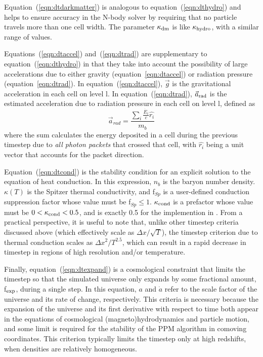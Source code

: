 Equation~(\ref{eqn:dtdarkmatter}) is analogous to
equation~(\ref{eqn:dthydro}) and helps to ensure accuracy in the N-body solver
by requiring that no particle travels more than one cell
width.  The parameter $\kappa_{\rm dm}$ is like $\kappa_{\rm
hydro}$, with a similar range of values.

Equations~(\ref{eqn:dtaccel}) and~(\ref{eqn:dtrad}) are supplementary to equation~(\ref{eqn:dthydro}) in that they
take into account the possibility of large accelerations due to either
gravity (equation~\ref{eqn:dtaccel}) or radiation pressure
(equation~\ref{eqn:dtrad}).  In equation~(\ref{eqn:dtaccel}), $\vec{g}$ is the
gravitational acceleration in each cell on level l.  In
equation~(\ref{eqn:dtrad}), $\vec{a}_{\rm rad}$ is the estimated
acceleration due to radiation pressure in each cell on level l,
defined as
\begin{equation}
\vec{a}_{rad} = \frac{ \sum_i \frac{\dot{E_i}}{c} \hat{r_i} }{m_b} 
\end{equation}
where the sum calculates the energy deposited in a cell during the
previous timestep due to \textit{all photon packets} that crossed that
cell, with $\hat{r_i}$ being a unit vector that accounts for the
packet direction.

Equation~(\ref{eqn:dtcond}) is the stability condition for an explicit
solution to the equation of heat conduction.  In this expression,
$n_b$ is the baryon number density. 
$\kappa(T)$ is the Spitzer thermal conductivity, and f$_{Sp}$ is a user-defined
conduction suppression factor whose value must be f$_{Sp} \leq 1$.  
$\kappa_{\rm cond}$ is a prefactor whose
value must be $0 < \kappa_{\rm cond}  < 0.5$, and is exactly 0.5 for the
implemention in \enzo.
From a practical
perspective, it is useful to note that, unlike other timestep criteria
discussed above (which effectively scale as $\Delta x / \sqrt{T}$),
the timestep criterion due to thermal conduction scales as $\Delta x^2
/ T^{2.5}$, which can result in a rapid decrease in timestep in
regions of high resolution and/or temperature.

Finally, equation~(\ref{eqn:dtexpand}) is a cosmological constraint that
limits the timestep so that the simulated universe only expands by
some fractional amount, f$_{\rm exp}$, during a single step.  In this
equation, $a$ and $\dot{a}$ refer to the scale factor of the universe
and its rate of change, respectively.  This criteria is necessary
because the expansion of the universe and its first derivative with
respect to time both appear in the equations of cosmological
(magneto)hydrodynamics and particle motion, and some limit is required
for the stability of the PPM algorithm in comoving coordinates.  This
criterion typically limits the timestep
only at high redshifts, when densities are relatively homogeneous.


